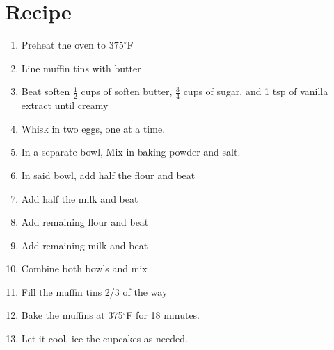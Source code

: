 \documentclass[10pt]{article}
\begin{document}
\section{Recipe}

\begin{enumerate}
    \item Preheat the oven to $375^{\circ}$F
    \item Line muffin tins with butter
    \item Beat soften $\frac{1}{2}$ cups of soften butter, $\frac{3}{4}$ cups of sugar, and 1 tsp of vanilla extract until creamy
    \item Whisk in two eggs, one at a time.
    \item In a separate bowl, Mix in baking powder and salt.
    \item In said bowl, add half the flour and beat
    \item Add half the milk and beat
    \item Add remaining flour and beat
    \item Add remaining milk and beat
    \item Combine both bowls and mix
    \item Fill the muffin tins 2/3 of the way
    \item Bake the muffins at 375$^{\circ}$F for 18 minutes.
    \item Let it cool, ice the cupcakes as needed.
\end{enumerate}
\end{document}
